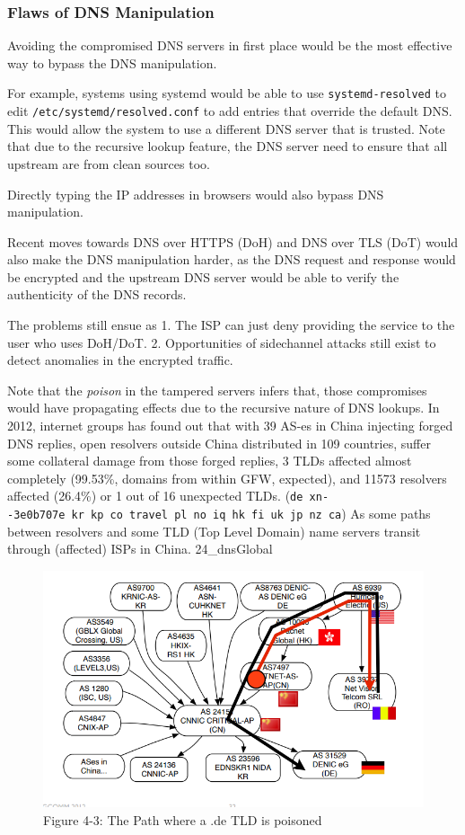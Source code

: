 \documentclass[sigconf]{acmart}
\begin{document}
\hypertarget{flaws-of-dns-manipulation}{%
\subsubsection{Flaws of DNS
Manipulation}\label{flaws-of-dns-manipulation}}

Avoiding the compromised DNS servers in first place would be the most
effective way to bypass the DNS manipulation.

For example, systems using systemd would be able to use
\texttt{systemd-resolved} to edit \texttt{/etc/systemd/resolved.conf} to
add entries that override the default DNS. This would allow the system
to use a different DNS server that is trusted. Note that due to the
recursive lookup feature, the DNS server need to ensure that all
upstream are from clean sources too.

Directly typing the IP addresses in browsers would also bypass DNS
manipulation.

Recent moves towards DNS over HTTPS (DoH) and DNS over TLS (DoT) would
also make the DNS manipulation harder, as the DNS request and response
would be encrypted and the upstream DNS server would be able to verify
the authenticity of the DNS records.

The problems still ensue as 1. The ISP can just deny providing the
service to the user who uses DoH/DoT. 2. Opportunities of sidechannel
attacks still exist to detect anomalies in the encrypted traffic.

Note that the \emph{poison} in the tampered servers infers that, those
compromises would have propagating effects due to the recursive nature
of DNS lookups. In 2012, internet groups has found out that with 39
AS-es in China injecting forged DNS replies, open resolvers outside
China distributed in 109 countries, suffer some collateral damage from
those forged replies, 3 TLDs affected almost completely (99.53\%,
domains from within GFW, expected), and 11573 resolvers affected
(26.4\%) or 1 out of 16 unexpected TLDs.
(\texttt{de\ xn-\/-3e0b707e\ kr\ kp\ co\ travel\ pl\ no\ iq\ hk\ fi\ uk\ jp\ nz\ ca})
As some paths between resolvers and some TLD (Top Level Domain) name
servers transit through (affected) ISPs in China. 24\_dnsGlobal

\begin{figure}
\centering
\includegraphics{res/4.3-de-poison.png}
\caption{Figure 4-3: The Path where a .de TLD is poisoned}
\end{figure}
\end{document}
